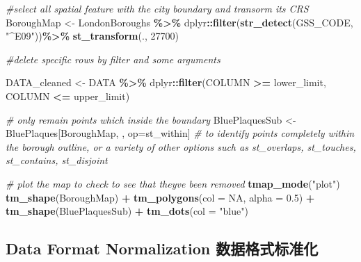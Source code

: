 \documentclass[
]{article}
\newenvironment{Shaded}{\begin{snugshade}}{\end{snugshade}}
\newcommand{\AttributeTok}[1]{\textcolor[rgb]{0.13,0.29,0.53}{#1}}
\newcommand{\CommentTok}[1]{\textcolor[rgb]{0.56,0.35,0.01}{\textit{#1}}}
\newcommand{\ConstantTok}[1]{\textcolor[rgb]{0.56,0.35,0.01}{#1}}
\newcommand{\DecValTok}[1]{\textcolor[rgb]{0.00,0.00,0.81}{#1}}
\newcommand{\FloatTok}[1]{\textcolor[rgb]{0.00,0.00,0.81}{#1}}
\newcommand{\FunctionTok}[1]{\textcolor[rgb]{0.13,0.29,0.53}{\textbf{#1}}}
\newcommand{\NormalTok}[1]{#1}
\newcommand{\OtherTok}[1]{\textcolor[rgb]{0.56,0.35,0.01}{#1}}
\newcommand{\SpecialCharTok}[1]{\textcolor[rgb]{0.81,0.36,0.00}{\textbf{#1}}}
\newcommand{\StringTok}[1]{\textcolor[rgb]{0.31,0.60,0.02}{#1}}
\begin{document}
\begin{Shaded}
\begin{Highlighting}[]
\CommentTok{\#select all spatial feature with the city boundary and transorm its CRS}
\NormalTok{BoroughMap }\OtherTok{\textless{}{-}}\NormalTok{ LondonBoroughs }\SpecialCharTok{\%\textgreater{}\%}
\NormalTok{  dplyr}\SpecialCharTok{::}\FunctionTok{filter}\NormalTok{(}\FunctionTok{str\_detect}\NormalTok{(GSS\_CODE, }\StringTok{"\^{}E09"}\NormalTok{))}\SpecialCharTok{\%\textgreater{}\%}
  \FunctionTok{st\_transform}\NormalTok{(., }\DecValTok{27700}\NormalTok{)}

\CommentTok{\#delete specific rows by filter and some arguments}

\NormalTok{DATA\_cleaned }\OtherTok{\textless{}{-}}\NormalTok{ DATA }\SpecialCharTok{\%\textgreater{}\%} 
\NormalTok{  dplyr}\SpecialCharTok{::}\FunctionTok{filter}\NormalTok{(COLUMN }\SpecialCharTok{\textgreater{}=}\NormalTok{ lower\_limit, COLUMN }\SpecialCharTok{\textless{}=}\NormalTok{ upper\_limit)}

\CommentTok{\# only remain points which inside the boundary}
\NormalTok{BluePlaquesSub }\OtherTok{\textless{}{-}}\NormalTok{ BluePlaques[BoroughMap, , op}\OtherTok{=}\NormalTok{st\_within]}
\CommentTok{\# to identify points completely within the borough outline, or a variety of other options such as st\_overlaps, st\_touches, st\_contains, st\_disjoint}

\CommentTok{\# plot the map to check to see that they\textquotesingle{}ve been removed}
\FunctionTok{tmap\_mode}\NormalTok{(}\StringTok{"plot"}\NormalTok{)}
\FunctionTok{tm\_shape}\NormalTok{(BoroughMap) }\SpecialCharTok{+}
  \FunctionTok{tm\_polygons}\NormalTok{(}\AttributeTok{col =} \ConstantTok{NA}\NormalTok{, }\AttributeTok{alpha =} \FloatTok{0.5}\NormalTok{) }\SpecialCharTok{+}
\FunctionTok{tm\_shape}\NormalTok{(BluePlaquesSub) }\SpecialCharTok{+}
  \FunctionTok{tm\_dots}\NormalTok{(}\AttributeTok{col =} \StringTok{"blue"}\NormalTok{)}
\end{Highlighting}
\end{Shaded}

\hypertarget{data-format-normalization-ux6570ux636eux683cux5f0fux6807ux51c6ux5316}{%
\subsection{Data Format Normalization
数据格式标准化}\label{data-format-normalization-ux6570ux636eux683cux5f0fux6807ux51c6ux5316}}
\end{document}
